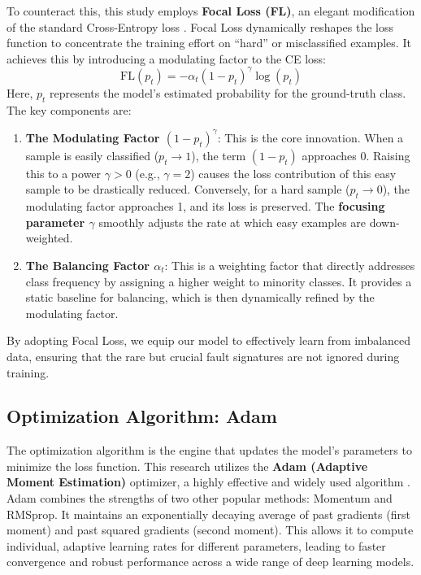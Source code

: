 To counteract this, this study employs \textbf{Focal Loss (FL)}, an elegant modification of the standard Cross-Entropy loss \citep{lin2017focal}. Focal Loss dynamically reshapes the loss function to concentrate the training effort on ``hard'' or misclassified examples. It achieves this by introducing a modulating factor to the CE loss:
\begin{equation}
\text{FL}(p_t) = - \alpha_t (1 - p_t)^\gamma \log(p_t)
\label{eq:focal_loss}
\end{equation}
Here, $p_t$ represents the model's estimated probability for the ground-truth class. The key components are:
\begin{enumerate}
    \item \textbf{The Modulating Factor $(1 - p_t)^\gamma$}: This is the core innovation. When a sample is easily classified ($p_t \to 1$), the term $(1 - p_t)$ approaches 0. Raising this to a power $\gamma > 0$ (e.g., $\gamma = 2$) causes the loss contribution of this easy sample to be drastically reduced. Conversely, for a hard sample ($p_t \to 0$), the modulating factor approaches 1, and its loss is preserved. The \textbf{focusing parameter $\gamma$} smoothly adjusts the rate at which easy examples are down-weighted.
    \item \textbf{The Balancing Factor $\alpha_t$}: This is a weighting factor that directly addresses class frequency by assigning a higher weight to minority classes. It provides a static baseline for balancing, which is then dynamically refined by the modulating factor.
\end{enumerate}
By adopting Focal Loss, we equip our model to effectively learn from imbalanced data, ensuring that the rare but crucial fault signatures are not ignored during training.

\subsection{Optimization Algorithm: Adam}
\label{sec:optimizer_adam}

The optimization algorithm is the engine that updates the model's parameters to minimize the loss function. This research utilizes the \textbf{Adam (Adaptive Moment Estimation)} optimizer, a highly effective and widely used algorithm \citep{kingma2014adam}. Adam combines the strengths of two other popular methods: Momentum and RMSprop. It maintains an exponentially decaying average of past gradients (first moment) and past squared gradients (second moment). This allows it to compute individual, adaptive learning rates for different parameters, leading to faster convergence and robust performance across a wide range of deep learning models.

